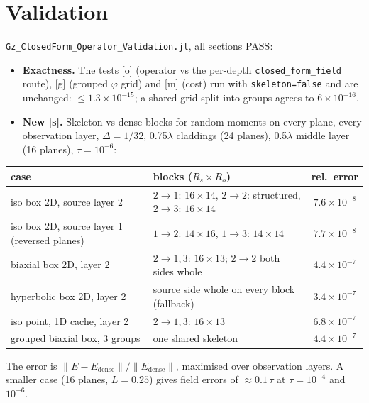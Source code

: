 \documentclass[11pt,a4paper]{article}
\newcommand{\code}[1]{\texttt{#1}}
\newcommand{\norm}[1]{\left\lVert #1 \right\rVert}
\theoremstyle{remark}
\begin{document}
\section{Validation}
\label{sec:validation}

\code{Gz\_ClosedForm\_Operator\_Validation.jl}, all sections PASS:
\begin{itemize}[leftmargin=*]
\item \textbf{Exactness.} The tests [o] (operator vs the per-depth \code{closed\_form\_field} route), [g] (grouped $\varphi$ grid)
  and [m] (cost) run with \code{skeleton=false} and are unchanged: $\le 1.3\times10^{-15}$; a shared grid split into groups agrees to $6\times10^{-16}$.
\item \textbf{New [s].} Skeleton vs dense blocks for random moments on every plane, every observation layer,
  $\Delta=1/32$, 0.75$\lambda$ claddings (24 planes), 0.5$\lambda$ middle layer (16 planes), $\tau=10^{-6}$:
\end{itemize}
\begin{center}
\small
\begin{tabular}{>{\raggedright\arraybackslash}p{4.6cm}>{\raggedright\arraybackslash}p{6.8cm}c}
\toprule
case & blocks ($R_s\times R_o$) & rel.\ error \\
\midrule
iso box 2D, source layer 2 & $2\to1$: $16\times14$, $2\to2$: structured, $2\to3$: $16\times14$ & $7.6\times10^{-8}$ \\
iso box 2D, source layer 1 (reversed planes) & $1\to2$: $14\times16$, $1\to3$: $14\times14$ & $7.7\times10^{-8}$ \\
biaxial box 2D, layer 2 & $2\to1,3$: $16\times13$; $2\to2$ both sides whole & $4.4\times10^{-7}$ \\
hyperbolic box 2D, layer 2 & source side whole on every block (fallback) & $3.4\times10^{-7}$ \\
iso point, 1D cache, layer 2 & $2\to1,3$: $16\times13$ & $6.8\times10^{-7}$ \\
grouped biaxial box, 3 groups & one shared skeleton & $4.4\times10^{-7}$ \\
\bottomrule
\end{tabular}
\end{center}
The error is $\norm{E-E_{\mathrm{dense}}}/\norm{E_{\mathrm{dense}}}$, maximised over observation layers.
A smaller case (16 planes, $L=0.25$) gives field errors of $\approx 0.1\,\tau$ at $\tau=10^{-4}$ and $10^{-6}$.
\end{document}

